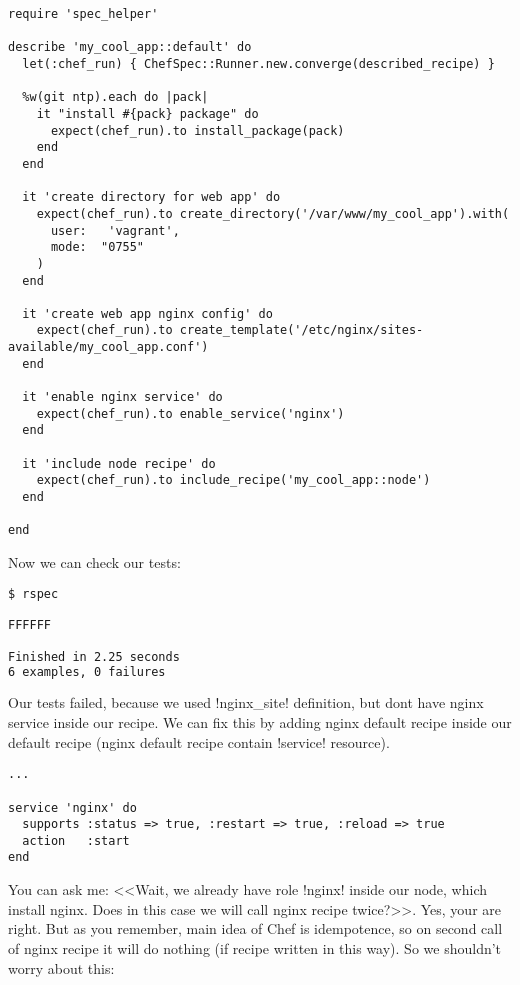 \begin{lstlisting}[label=lst:testing-chefspec3,title=my-server-cloud/site-cookbooks/my\_cool\_app/spec/unit/recipes/default\_spec.rb]
require 'spec_helper'

describe 'my_cool_app::default' do
  let(:chef_run) { ChefSpec::Runner.new.converge(described_recipe) }

  %w(git ntp).each do |pack|
    it "install #{pack} package" do
      expect(chef_run).to install_package(pack)
    end
  end

  it 'create directory for web app' do
    expect(chef_run).to create_directory('/var/www/my_cool_app').with(
      user:   'vagrant',
      mode:  "0755"
    )
  end

  it 'create web app nginx config' do
    expect(chef_run).to create_template('/etc/nginx/sites-available/my_cool_app.conf')
  end

  it 'enable nginx service' do
    expect(chef_run).to enable_service('nginx')
  end

  it 'include node recipe' do
    expect(chef_run).to include_recipe('my_cool_app::node')
  end

end
\end{lstlisting}

Now we can check our tests:

\begin{lstlisting}[language=Bash,label=lst:testing-chefspec5]
$ rspec

FFFFFF

Finished in 2.25 seconds
6 examples, 0 failures
\end{lstlisting}

Our tests failed, because we used \inline!nginx_site! definition, but dont have nginx service inside our recipe. We can fix this by adding nginx default recipe inside our default recipe (nginx default recipe contain \inline!service! resource).

\begin{lstlisting}[label=lst:testing-chefspec-nginx]
...

service 'nginx' do
  supports :status => true, :restart => true, :reload => true
  action   :start
end
\end{lstlisting}

You can ask me: <<Wait, we already have role \inline!nginx! inside our node, which install nginx. Does in this case we will call nginx recipe twice?>>. Yes, your are right. But as you remember, main idea of Chef is idempotence, so on second call of nginx recipe it will do nothing (if recipe written in this way). So we shouldn't worry about this:

